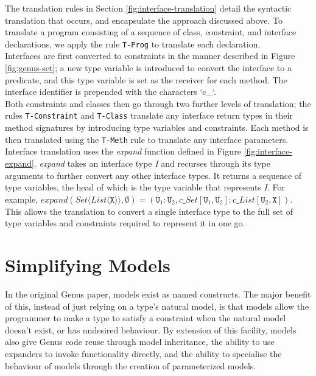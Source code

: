 The translation rules in Section \ref{fig:interface-translation} detail the syntactic translation that occurs, and encapsulate the approach discussed above. To translate a program consisting of a sequence of class, constraint, and interface declarations, we apply the rule \texttt{T-Prog} to translate each declaration. \\

Interfaces are first converted to constraints in the manner described in Figure \ref{fig:genus-set}; a new type variable is introduced to convert the interface to a predicate, and this type variable is set as the receiver for each method. The interface identifier is prepended with the characters `c\_`. \\

Both constraints and classes then go through two further levels of translation; the rules \texttt{T-Constraint} and \texttt{T-Class} translate any interface return types in their method signatures by introducing type variables and constraints. Each method is then translated using the \texttt{T-Meth} rule to translate any interface parameters. \\

Interface translation uses the \textit{expand} function defined in Figure \ref{fig:interface-expand}. \textit{expand} takes an interface type \textit{I} and recurses through its type arguments to further convert any other interface types. It returns a sequence of type variables, the head of which is the type variable that represents \textit{I}. For example, $expand(Set \langle List \langle \texttt{X} \rangle \rangle, \emptyset) = (\texttt{U}_1 : \texttt{U}_2, c\_Set[\texttt{U}_1, \texttt{U}_2] : c\_List[\texttt{U}_2, \texttt{X}])$. This allows the translation to convert a single interface type to the full set of type variables and constraints required to represent it in one go.

\newpage

\section{Simplifying Models} \label{model-just}

In the original Genus paper, models exist as named constructs. The major benefit of this, instead of just relying on a type's natural model, is that models allow the programmer to make a type to satisfy a constraint when the natural model doesn't exist, or has undesired behaviour.  By extension of this facility, models also give Genus code reuse through model inheritance, the ability to use expanders to invoke functionality directly, and the ability to specialise the behaviour of models through the creation of parameterized models. \\

